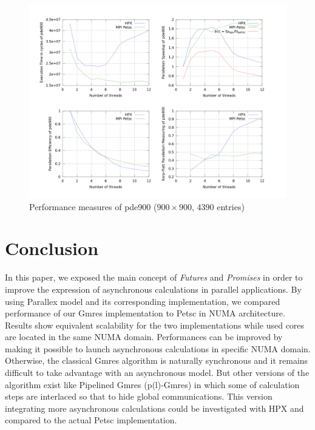\documentclass[smallextended]{svjour3}
\begin{document}
\begin{figure}[h!]
\begin{center}
\includegraphics[scale=0.25]{Images/pde900.jpeg}
\end{center}
\caption{Performance measures of pde900 ($900\times900$, 4390 entries)}
\label{pde900}
\end{figure}

\newpage

\section{Conclusion}
In this paper, we exposed the main concept of \emph{Futures} and \emph{Promises} in order to improve the expression of asynchronous calculations in parallel applications. By using Parallex model and its corresponding implementation, we compared performance of our Gmres implementation to Petsc in NUMA architecture. Results show equivalent scalability for the two implementations while used cores are located in the same NUMA domain. Performances can be improved by making it possible to launch asynchronous calculations in specific NUMA domain. Otherwise, the classical Gmres algorithm is naturally synchronous and it remains difficult to take advantage with an asynchronous model. But other versions of the algorithm exist like Pipelined Gmres (p(l)-Gmres) \cite{Parall_GMRES} in which some of calculation steps are interlaced so that to hide global communications. This version integrating more asynchronous calculations could be investigated with HPX and compared to the actual Petsc implementation.



\end{document}
